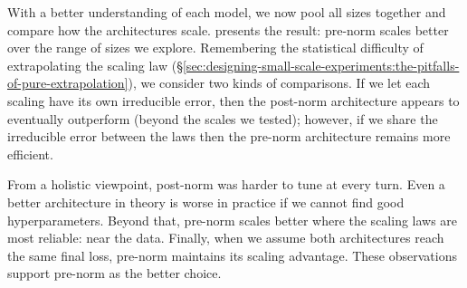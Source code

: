 With a better understanding of each model, we now pool all sizes together and compare how the architectures scale.  presents the result: pre-norm scales better over the range of sizes we explore. Remembering the statistical difficulty of extrapolating the scaling law (\S\ref{sec:designing-small-scale-experiments:the-pitfalls-of-pure-extrapolation}), we consider two kinds of comparisons. If we let each scaling have its own irreducible error, then the post-norm architecture appears to eventually outperform (beyond the scales we tested); however, if we share the irreducible error between the laws then the pre-norm architecture remains more efficient.

From a holistic viewpoint, post-norm was harder to tune at every turn. Even a better architecture in theory is worse in practice if we cannot find good hyperparameters. Beyond that, pre-norm scales better where the scaling laws are most reliable: near the data. Finally, when we assume both architectures reach the same final loss, pre-norm maintains its scaling advantage. These observations support pre-norm as the better choice.